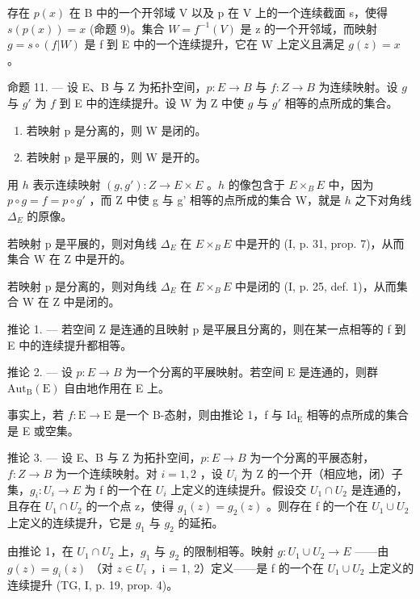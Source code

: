 存在 \(p(x)\) 在 B 中的一个开邻域 V 以及 p 在 V 上的一个连续截面 s，使得 \(s(p(x)) = x\) (命题 9)。集合 \(W = f^{-1}(V)\) 是 z 的一个开邻域，而映射 \(g = s \circ (f|W)\) 是 f 到 E 中的一个连续提升，它在 W 上定义且满足 \(g(z) = x\) 。

命题 11. --- 设 E、B 与 Z 为拓扑空间，\(p\colon E \to B\) 与 \(f\colon Z \to B\) 为连续映射。设 \(g\) 与 \(g'\) 为 \(f\) 到 E 中的连续提升。设 W 为 Z 中使 \(g\) 与 \(g'\) 相等的点所成的集合。

\begin{enumerate}
\def\labelenumi{\alph{enumi})}
\item
  若映射 p 是分离的，则 W 是闭的。
\item
  若映射 p 是平展的，则 W 是开的。
\end{enumerate}

用 \(h\) 表示连续映射 \((g, g')\colon Z \to E \times E\) 。\(h\) 的像包含于 \(E \times_{B} E\) 中，因为 \(p \circ g = f = p \circ g'\) ，而 Z 中使 g 与 g' 相等的点所成的集合 W，就是 \(h\) 之下对角线 \(\Delta_{E}\) 的原像。

若映射 p 是平展的，则对角线 \(\Delta_{E}\) 在 \(E \times_{B} E\) 中是开的 (I, p. 31, prop. 7)，从而集合 W 在 Z 中是开的。

若映射 p 是分离的，则对角线 \(\Delta_{E}\) 在 \(E \times_{B} E\) 中是闭的 (I, p. 25, def. 1)，从而集合 W 在 Z 中是闭的。

推论 1. --- 若空间 Z 是连通的且映射 p 是平展且分离的，则在某一点相等的 f 到 E 中的连续提升都相等。

推论 2. --- 设 \(p\colon E \to B\) 为一个分离的平展映射。若空间 E 是连通的，则群 \(\mathrm{Aut}_{\mathrm{B}}(\mathrm{E})\) 自由地作用在 E 上。

事实上，若 \(f: \mathrm{E} \to \mathrm{E}\) 是一个 B-态射，则由推论 1，f 与 \(\mathrm{Id}_{\mathrm{E}}\) 相等的点所成的集合是 E 或空集。

推论 3. --- 设 E、B 与 Z 为拓扑空间，\(p\colon E \to B\) 为一个分离的平展态射，\(f\colon Z \to B\) 为一个连续映射。对 \(i = 1,2\) ，设 \(U_i\) 为 Z 的一个开（相应地，闭）子集，\(g_i\colon U_i \to E\) 为 f 的一个在 \(U_i\) 上定义的连续提升。假设交 \(U_1 \cap U_2\) 是连通的，且存在 \(U_1 \cap U_2\) 的一个点 z，使得 \(g_1(z) = g_2(z)\) 。则存在 f 的一个在 \(U_1 \cup U_2\) 上定义的连续提升，它是 \(g_1\) 与 \(g_2\) 的延拓。

由推论 1，在 \(U_{1} \cap U_{2}\) 上，\(g_{1}\) 与 \(g_{2}\) 的限制相等。映射 \(g: U_{1} \cup U_{2} \to E\) ——由 \(g(z) = g_{i}(z)\) （对 \(z \in U_{i}\) ，i = 1, 2）定义——是 f 的一个在 \(U_{1} \cup U_{2}\) 上定义的连续提升 (TG, I, p. 19, prop. 4)。

